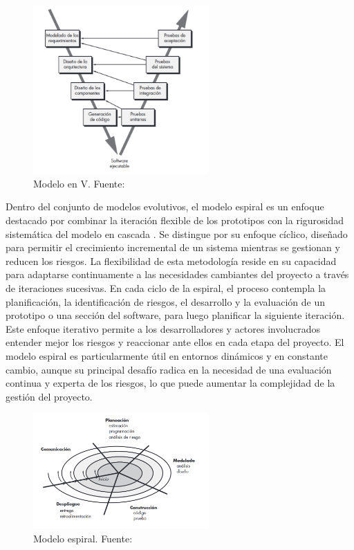 \begin{figure}[!htb]
	\centering
	\includegraphics[width=0.6\textwidth]{Figures/model-v.png}
	\caption{Modelo en V. Fuente: \cite{pressman2010ingenieria}}
\end{figure}

Dentro del conjunto de modelos evolutivos, el modelo espiral es un enfoque destacado por combinar la iteración flexible de los prototipos con la rigurosidad sistemática del modelo en cascada \cite{pressman2010ingenieria}. Se distingue por su enfoque cíclico, diseñado para permitir el crecimiento incremental de un sistema mientras se gestionan y reducen los riesgos. La flexibilidad de esta metodología reside en su capacidad para adaptarse continuamente a las necesidades cambiantes del proyecto a través de iteraciones sucesivas. En cada ciclo de la espiral, el proceso contempla la planificación, la identificación de riesgos, el desarrollo y la evaluación de un prototipo o una sección del software, para luego planificar la siguiente iteración. Este enfoque iterativo permite a los desarrolladores y actores involucrados entender mejor los riesgos y reaccionar ante ellos en cada etapa del proyecto. El modelo espiral es particularmente útil en entornos dinámicos y en constante cambio, aunque su principal desafío radica en la necesidad de una evaluación continua y experta de los riesgos, lo que puede aumentar la complejidad de la gestión del proyecto.

\begin{figure}[!htb]
    \centering
    \includegraphics[width=0.6\textwidth]{Figures/model-spiral.png}
    \caption{Modelo espiral. Fuente: \cite{pressman2010ingenieria}}
\end{figure}


